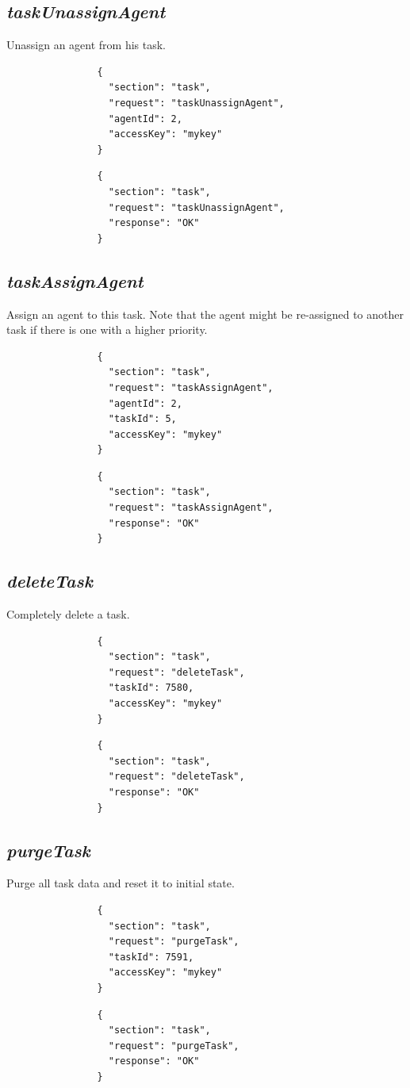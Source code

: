 		\subsection*{\textit{taskUnassignAgent}}
			Unassign an agent from his task.
			{
				\color{blue}
				\begin{verbatim}
				{
				  "section": "task",
				  "request": "taskUnassignAgent",
				  "agentId": 2,
				  "accessKey": "mykey"
				}
				\end{verbatim}
			}
			{
				\color{OliveGreen}
				\begin{verbatim}
				{
				  "section": "task",
				  "request": "taskUnassignAgent",
				  "response": "OK"
				}
				\end{verbatim}
			}
		\subsection*{\textit{taskAssignAgent}}
			Assign an agent to this task. Note that the agent might be re-assigned to another task if there is one with a higher priority.
			{
				\color{blue}
				\begin{verbatim}
				{
				  "section": "task",
				  "request": "taskAssignAgent",
				  "agentId": 2,
				  "taskId": 5,
				  "accessKey": "mykey"
				}
				\end{verbatim}
			}
			{
				\color{OliveGreen}
				\begin{verbatim}
				{
				  "section": "task",
				  "request": "taskAssignAgent",
				  "response": "OK"
				}
				\end{verbatim}
			}
		\subsection*{\textit{deleteTask}}
			Completely delete a task.
			{
				\color{blue}
				\begin{verbatim}
				{
				  "section": "task",
				  "request": "deleteTask",
				  "taskId": 7580,
				  "accessKey": "mykey"
				}
				\end{verbatim}
			}
			{
				\color{OliveGreen}
				\begin{verbatim}
				{
				  "section": "task",
				  "request": "deleteTask",
				  "response": "OK"
				}
				\end{verbatim}
			}		
		\subsection*{\textit{purgeTask}}
			Purge all task data and reset it to initial state.
			{
				\color{blue}
				\begin{verbatim}
				{
				  "section": "task",
				  "request": "purgeTask",
				  "taskId": 7591,
				  "accessKey": "mykey"
				}
				\end{verbatim}
			}
			{
				\color{OliveGreen}
				\begin{verbatim}
				{
				  "section": "task",
				  "request": "purgeTask",
				  "response": "OK"
				}
				\end{verbatim}
			}
